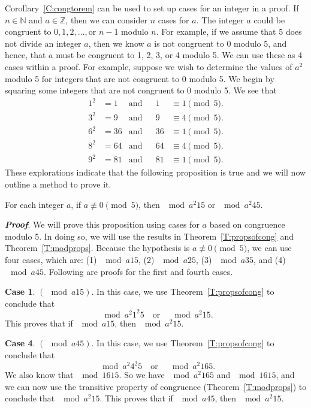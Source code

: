 Corollary~\ref{C:congtorem} can be used to set up cases for an integer in a proof.  If  $n \in \mathbb{N}$  and  $a \in \mathbb{Z}$, then we can consider  $n$  cases for  $a$.  The integer  $a$  could be congruent to  
$0,1,2, \ldots , \text{or } n - 1$  modulo  $n$.  For example, if we assume that 5 does not divide an integer $a$, then we know  $a$ is not congruent to 0 modulo 5, and hence, that $a$ must be congruent to 1, 2, 3, or 4 modulo 5.  We can use these as 4 cases within a proof.  %
For example, suppose we wish to determine the values of $a^2$ modulo 5 for integers that are not congruent to 0 modulo 5.  We begin by squaring some integers that are not congruent to 0 modulo 5.  We see that
\begin{align*}
1^2 &= 1 & \text{and} & &1 &\equiv 1 \pmod 5. \\
3^2 &= 9 & \text{and} & &9 &\equiv 4 \pmod 5. \\
6^2 &= 36 & \text{and} & &36 &\equiv 1 \pmod 5. \\
8^2 &= 64 & \text{and} & &64 &\equiv 4 \pmod 5. \\
9^2 &= 81 & \text{and} & &81 &\equiv 1 \pmod 5. 
\end{align*}
These explorations indicate that the following proposition is true and we will now outline a method to prove it.   
\begin{proposition} \label{prop:congmod5}
For each integer $a$, if $a \not \equiv 0 \pmod 5$, then $\mod{a^2}{1}{5}$ or $\mod{a^2}{4}{5}$.
\end{proposition}
\newpar
\textbf{\emph{Proof}}. We will prove this proposition using cases for $a$ based on congruence modulo 5.  In doing so, we will use the results in Theorem~\ref{T:propsofcong} and Theorem~\ref{T:modprops}.  Because the hypothesis is $a \not \equiv 0 \pmod 5$, we can use four cases, which are:  (1) $\mod{a}{1}{5}$, (2) $\mod{a}{2}{5}$, (3) $\mod{a}{3}{5}$, and (4) $\mod{a}{4}{5}$.  Following are proofs for the first and fourth cases.

\newpar
\textbf{Case 1}.  $\left( \mod{a}{1}{5} \right)$.  In this case, we use Theorem~\ref{T:propsofcong} to conclude that
\[
\mod{a^2}{1^2}{5} \quad \text{or} \quad \mod{a^2}{1}{5}.
\]
This proves that if $\mod{a}{1}{5}$, then $\mod{a^2}{1}{5}$.

\newpar
\textbf{Case 4}.  $\left( \mod{a}{4}{5} \right)$.  In this case, we use Theorem~\ref{T:propsofcong} to conclude that
\[
\mod{a^2}{4^2}{5} \quad \text{or} \quad \mod{a^2}{16}{5}.
\]
We also know that $\mod{16}{1}{5}$.  So we have $\mod{a^2}{16}{5}$ and $\mod{16}{1}{5}$, and we can now use the transitive property of congruence (Theorem~\ref{T:modprops}) to conclude that $\mod{a^2}{1}{5}$.  This proves that if $\mod{a}{4}{5}$, then $\mod{a^2}{1}{5}$.

